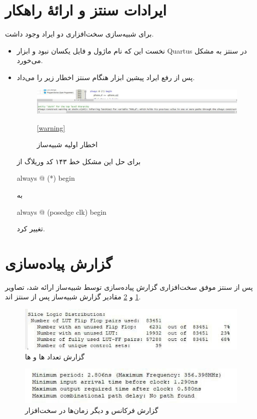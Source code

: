 \section{ایرادات سنتز و ارائهٔ راهکار}
برای شبیه‌سازی سخت‌افزاری دو ایراد وجود داشت.
\begin{itemize}
\item 
نخست این که نام ماژول و فایل یکسان نبود و ابزار 
Quartus 
در سنتز به مشکل می‌خورد.
\item 
پس از رفع ایراد پیشین ابزار هنگام سنتز اخطار زیر را می‌داد.
\begin{figure}[H]
\includegraphics[width = \textwidth]{figs/synthesize/warning.jpg}
\caption{اخطار اولیه شبیه‌ساز}
\ref{warning}
\end{figure}
 برای حل این مشکل خط ۱۴۳ کد وریلاگ از 
 \begin{code}
 	always @ (*) begin
 \end{code}
 به 
 \begin{code}
 	always @ (posedge clk) begin
 \end{code}
 تغییر کرد. 
\end{itemize}

\section{گزارش پیاده‌سازی}
پس از سنتز موفق سخت‌افزاری گزارش پیاده‌سازی توسط شبیه‌ساز ارائه شد، تصاویر 
\ref{statistic_1}
و 
\ref{statistic_2}
مقادیر گزارش‌ شبیه‌ساز پس از سنتز اند.

\begin{figure}[H]
\includegraphics[scale=1]{figs/synthesize/flip_flop_pairs.jpg}
\caption{گزارش تعداد  ها و  ها}
\label{statistic_1}
\end{figure}

\begin{figure}[H]
\includegraphics[scale=1]{figs/synthesize/statistics.jpg}
\caption{گزارش فرکانس و دیگر زمان‌ها در سخت‌افزار}
\label{statistic_2}
\end{figure}
